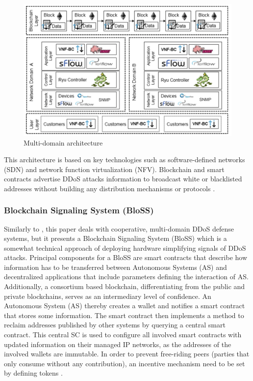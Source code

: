 \begin{figure}[ht]
  \begin{center}
    \includegraphics[scale=0.5]{Talk7/img/ddos/multi_domain}
  \end{center}
  \caption{Multi-domain architecture}
  \label{ddos_multi_domain_architecture}
\end{figure}

This architecture is based on key technologies such as software-defined networks (SDN) and network function virtualization (NFV). Blockchain and smart contracts advertise DDoS attacks information to broadcast white or blacklisted addresses without building any distribution mechanisms or protocols \cite{Rodrigues2017}.

\subsubsection{Blockchain Signaling System (BloSS)}

Similarly to \cite{Rodrigues2017}, this paper deals with cooperative, multi-domain DDoS defense systems, but it presents a Blockchain Signaling System (BloSS) which is a somewhat technical approach of deploying hardware simplifying signals of DDoS attacks. Principal components for a BloSS are smart contracts that describe how information has to be transferred between Autonomous Systems (AS) and decentralized applications that include parameters defining the interaction of AS. Additionally, a consortium based blockchain, differentiating from the public and private blockchains, serves as an intermediary level of confidence. An Autonomous System (AS) thereby creates a wallet and notifies a smart contract that stores some information. The smart contract then implements a method to reclaim addresses published by other systems by querying a central smart contract. This central SC is used to configure all involved smart contracts with updated information on their managed IP networks, as the addresses of the involved wallets are immutable. In order to prevent free-riding peers (parties that only consume without any contribution), an incentive mechanism need to be set by defining tokens \cite{Rodrigues2019}.  %

